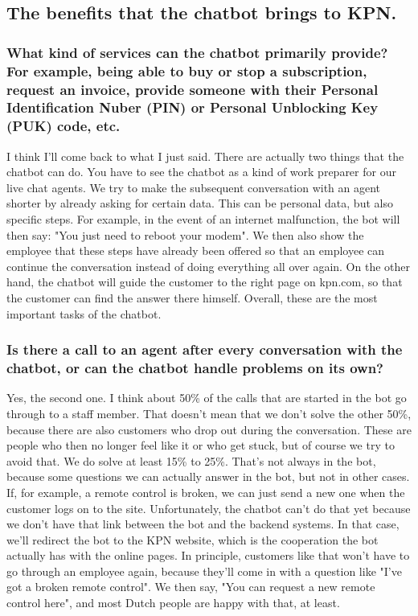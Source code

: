 \begin{appendices}
	\subsection{The benefits that the chatbot brings to KPN.}
	\subsubsection{What kind of services can the chatbot primarily provide? For example,
		being able to buy or stop a subscription, request an invoice, provide someone
		with their Personal Identification Nuber (PIN) or Personal Unblocking Key
		(PUK) code, etc.}
	I think I'll come back to what I just said. There are actually two things that the chatbot can do. You have to see the chatbot as a kind of work preparer for our live chat agents. We try to make the subsequent conversation with an agent shorter by already asking for certain data. This can be personal data, but also specific steps. For example, in the event of an internet malfunction, the bot will then say: "You just need to reboot your modem". We then also show the employee that these steps have already been offered so that an employee can continue the conversation instead of doing everything all over again. On the other hand, the chatbot will guide the customer to the right page on kpn.com, so that the customer can find the answer there himself. Overall, these are the most important tasks of the chatbot.
	
	\subsubsection{Is there a call to an agent after every conversation with the chatbot, or can the chatbot handle problems on its own?}
	Yes, the second one. I think about 50\% of the calls that are started in the bot go through to a staff member. That doesn't mean that we don't solve the other 50\%, because there are also customers who drop out during the conversation. These are people who then no longer feel like it or who get stuck, but of course we try to avoid that. We do solve at least 15\% to 25\%. That's not always in the bot, because some questions we can actually answer in the bot, but not in other cases. If, for example, a remote control is broken, we can just send a new one when the customer logs on to the site. Unfortunately, the chatbot can't do that yet because we don't have that link between the bot and the backend systems. In that case, we'll redirect the bot to the KPN website, which is the cooperation the bot actually has with the online pages. In principle, customers like that won't have to go through an employee again, because they'll come in with a question like "I've got a broken remote control". We then say, "You can request a new remote control here", and most Dutch people are happy with that, at least.
	

\end{appendices}
